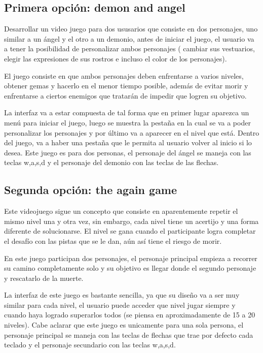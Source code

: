 \documentclass{article}
\begin{document}
\subsection{Primera opción: demon and angel}
Desarrollar un video juego para dos ususarios que consiste en dos personajes, uno similar a un ángel y el otro a un demonio, antes de iniciar el juego, el usuario va a tener la posibilidad de personalizar ambos personajes ( cambiar sus vestuarios, elegir las expresiones de sus rostros e incluso el color de los personajes). 
\vspace{0.2 cm}

El juego consiste en que ambos personajes deben enfrentarse a varios niveles, obtener gemas y hacerlo en el menor tiempo posible, además de evitar morir y enfrentarse a ciertos enemigos que tratarán de impedir que logren su objetivo. 
\vspace{0.2 cm}

La interfaz va a estar compuesta de tal forma que en primer lugar aparezca un menú para iniciar el juego, luego se muestra la pestaña en la cual se va a poder personalizar los personajes y por último va a aparecer en el nivel que está. Dentro del juego, va a haber una pestaña que le permita al usuario volver al inicio si lo desea. Este juego es para dos personas, el personaje del ángel se maneja con las teclas w,a,s,d y el personaje del demonio con las teclas de las flechas.

\subsection{Segunda opción: the again game}
Este videojuego sigue un concepto que consiste en aparentemente repetir el mismo nivel una y otra vez, sin embargo, cada nivel tiene un acertijo y una forma diferente de solucionarse. El nivel se gana cuando el participante logra completar el desafío con las pistas que se le dan, aún así tiene el riesgo de morir. 

En este juego participan dos personajes, el personaje principal empieza a recorrer su camino completamente solo y su objetivo es llegar donde el segundo personaje y rescatarlo de la muerte.

La interfaz de este juego es bastante sencilla, ya que su diseño va a ser muy similar para cada nivel, el usuario puede acceder que nivel jugar siempre y cuando haya logrado superarlos todos (se piensa en aproximadamente de 15 a 20 niveles). Cabe aclarar que este juego es unicamente para una sola persona, el personaje principal se maneja con las teclas de flechas que trae por defecto cada teclado y el personaje secundario con las teclas w,a,s,d.
\end{document}
